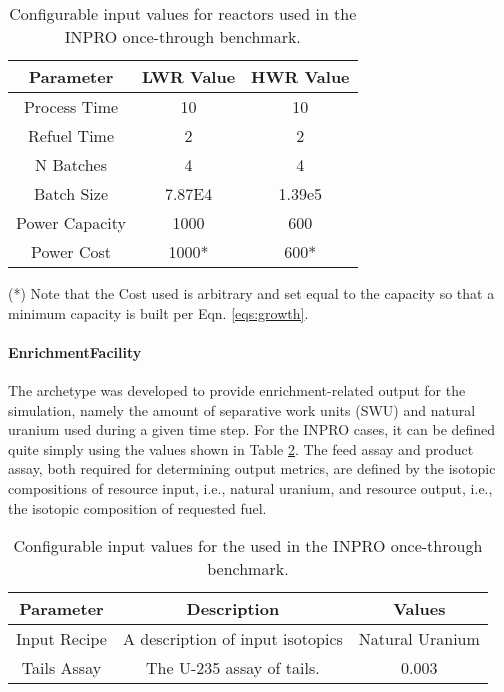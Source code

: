 \begin{table}[h]
\centering
\begin{threeparttable}
\begin{tabular}{ccc}
Parameter      & LWR Value & HWR Value               \\ \hline
Process Time   & 10         & 10                       \\
Refuel Time    & 2          & 2                        \\
N Batches      & 4          & 4                        \\
Batch Size     & 7.87E4     & 1.39e5                   \\
Power Capacity & 1000       & 600                      \\
Power Cost     & 1000*      & 600* \\ \hline
\end{tabular}
\begin{tablenotes}
  \small
  \item (*) Note that the Cost used is arbitrary and set equal to the
  capacity so that a minimum capacity is built per Eqn. \ref{eqs:growth}.
\end{tablenotes}
\end{threeparttable}
\caption{Configurable input values for reactors used in the INPRO once-through benchmark.}
\label{tbl:inprorxtr}
\end{table}

\paragraph{EnrichmentFacility}

The  archetype was developed to provide
enrichment-related output for the simulation, namely the amount of separative
work units (SWU) and natural uranium used during a given time step. For the
INPRO cases, it can be defined quite simply using the values shown in Table
\ref{tbl:inproenr}. The feed assay and product assay, both required for
determining output metrics, are defined by the isotopic compositions of
resource input, i.e., natural uranium, and resource output, i.e., the isotopic
composition of requested fuel.

\begin{table}[h]
\centering
\begin{tabular}{ccc}
Parameter    & Description                      & Values          \\ \hline
Input Recipe & A description of input isotopics & Natural Uranium \\
Tails Assay  & The U-235 assay of tails.        & 0.003          
\end{tabular}
\caption{Configurable input values for the  used in the
  INPRO once-through benchmark.}
\label{tbl:inproenr}
\end{table}

